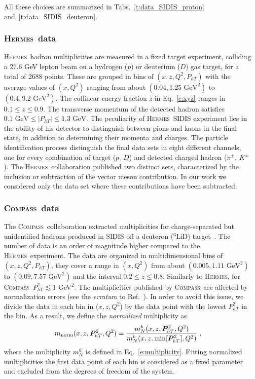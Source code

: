 \documentclass[aps,preprintnumbers,showpacs,nofootinbib,superscriptaddress,floatfix]{revtex4}
\newcommand{\hermes}{\textsc{Hermes}}
\newcommand{\compass}{\textsc{Compass}}
\newcommand{\Tperp}{T}
\begin{document}
All these choices are summarized in Tabs.~\ref{t:data_SIDIS_proton} and~\ref{t:data_SIDIS_deuteron}.

\subsubsection{\hermes\ data}
\label{sss:hermes}

\hermes\ hadron multiplicities are measured in a fixed target experiment,
colliding a $27.6$ GeV lepton beam on a hydrogen ($p$) or deuterium ($D$) gas
target, for a total of 2688 points.
These are grouped in bins of $(x,z,Q^2,P_{hT})$ with the average values of $(x,Q^2)$ ranging from about $(0.04, 1.25\text{ GeV}^2)$ to $(0.4, 9.2\text{ GeV}^2)$. 
The collinear energy fraction $z$ in Eq.~\eqref{e:xyz} ranges in $0.1\leq z\leq 0.9$. The transverse momentum of the detected hadron satisfies $0.1 \text{ GeV} \leq \vert P_{hT} \vert \leq 1.3 \text{ GeV}$.
The peculiarity of \hermes\ SIDIS experiment lies in the ability of his detector to distinguish between pions and kaons in the final state, in addition to determining their momenta and charges.
The particle identification process distinguish the final data sets in eight
different channels, one for every combination of target ($p,\,D$) and detected
charged hadron ($\pi^\pm, \,  K^\pm$ ). The
\hermes\ collaboration published two distinct sets, characterized by the inclusion or subtraction of the vector meson contribution. In our work we considered only the data set where these contributions have been subtracted. 


\subsubsection{\compass\ data}
\label{sss:compass}

The \compass\ collaboration extracted multiplicities for charge-separated but unidentified hadrons produced in SIDIS off a deuteron ($^6\text{LiD}$) target~\cite{Adolph:2013stb}.  The number of data is an order of magnitude higher compared to the \hermes\ experiment.
The data are organized in multidimensional bins of $(x,z,Q^2,P_{h\Tperp})$, they cover a range in $(x,Q^2)$ from about $(0.005, 1.11\text{ GeV}^2)$ to $(0.09, 7.57\text{ GeV}^2)$ and the interval $0.2 \leq z \leq 0.8$. Similarly to \hermes , for \compass\ $P_{h\Tperp}^2 \lesssim 1$ GeV$^2$. 
The multiplicities published by \compass\ are affected by normalization
errors (see the {\em erratum} to Ref.~\cite{Adolph:2013stb}). In order to
avoid this issue, we divide the data in each bin in ($x, z, Q^2$) by the data
point with the lowest $P_{hT}^2$ in the bin. 
As a result, we define the {\em normalized} multiplicity as
\begin{equation}
m_{\text{norm}}(x,z,\bm{P}_{h\Tperp}^2, Q^2) = \frac{m_N^h(x,z,\bm{P}_{h\Tperp}^2, Q^2)}{m_N^h (x,z,{\rm \min}[\bm{P}_{h\Tperp}^2], Q^2)} \ ,
\label{e:mult_norm}
\end{equation}
where the multiplicity $m_N^h$ is defined in Eq.~\eqref{e:multiplicity}. Fitting normalized multiplicities the first data point of each bin is considered as a fixed parameter and excluded from the degrees of freedom of the system.
\end{document}
